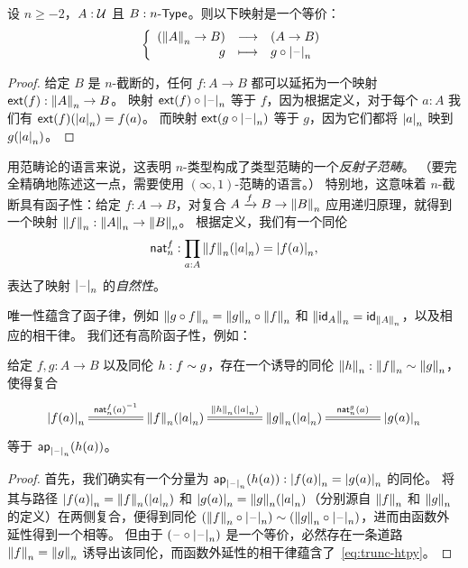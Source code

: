 \begin{lem}[截断的泛性质]\label{thm:trunc-reflective}
  设 $n\ge-2$，$A:\type$ 且 $B:\typele{n}$。则以下映射是一个等价：
  \[\function{(\trunc nA\to{}B)}{(A\to{}B)}{g}{g\circ\tprojf n}\]
\end{lem}

\begin{proof}
  给定 $B$ 是 $n$-截断的，任何 $f:A\to{}B$ 都可以延拓为一个映射 $\extend{f}:\trunc nA\to{}B$。
  映射 $\extend{f}\circ\tprojf n$ 等于 $f$，因为根据定义，对于每个 $a:A$ 我们有 $\extend{f}(\tproj na)=f(a)$。
  而映射 $\extend{g\circ\tprojf n}$ 等于 $g$，因为它们都将 $\tproj na$ 映到 $g(\tproj na)$。
\end{proof}

用范畴论的语言来说，这表明 $n$-类型构成了类型范畴的一个\emph{反射子范畴}。
%
（要完全精确地陈述这一点，需要使用 $(\infty,1)$-范畴的语言。）
%
特别地，这意味着 $n$-截断具有函子性：给定 $f:A\to B$，对复合 $A\xrightarrow{f} B \to \trunc n B$ 应用递归原理，就得到一个映射 $\trunc n f: \trunc n A \to \trunc n B$。
根据定义，我们有一个同伦
\begin{equation}
  \mathsf{nat}^f_n : \prd{a:A} \trunc n f(\tproj n a) = \tproj n {f(a)},\label{eq:trunc-nat}
\end{equation}
表达了映射 $\tprojf n$ 的\emph{自然性}。

唯一性蕴含了函子律，例如 $\trunc n {g\circ f} = \trunc n g \circ \trunc n f$ 和 $\trunc n{\idfunc[A]} = \idfunc[\trunc n A]$，以及相应的相干律。
我们还有高阶函子性，例如：

\begin{lem}\label{thm:trunc-htpy}
  给定 $f,g:A\to B$ 以及同伦 $h:f\htpy g$，存在一个诱导的同伦 $\trunc n h : \trunc n f \htpy \trunc n g$，使得复合
  \begin{equation}
    \xymatrix@C=3.6pc{\tproj n{f(a)} \ar@{=}[r]^-{\opp{\mathsf{nat}^f_n(a)}} &
      \trunc n f(\tproj n a) \ar@{=}[r]^-{\trunc n h(\tproj na)} &
      \trunc n g(\tproj n a) \ar@{=}[r]^-{\mathsf{nat}^g_n(a)} &
      \tproj n{g(a)}}\label{eq:trunc-htpy}
  \end{equation}
  等于 $\apfunc{\tprojf n}(h(a))$。
\end{lem}

\begin{proof}
  首先，我们确实有一个分量为 $\apfunc{\tprojf n}(h(a)) : \tproj n{f(a)} = \tproj n{g(a)}$ 的同伦。
  将其与路径 $\tproj n{f(a)} = \trunc n f(\tproj n a)$ 和 $\tproj n{g(a)} = \trunc n g(\tproj n a)$（分别源自 $\trunc n f$ 和 $\trunc ng$ 的定义）在两侧复合，便得到同伦 $(\trunc n f \circ \tprojf n) \htpy (\trunc n g \circ \tprojf n)$，进而由函数外延性得到一个相等。
  但由于 $(\blank\circ \tprojf n)$ 是一个等价，必然存在一条道路 $\trunc nf = \trunc ng$ 诱导出该同伦，而函数外延性的相干律蕴含了~\eqref{eq:trunc-htpy}。
\end{proof}

